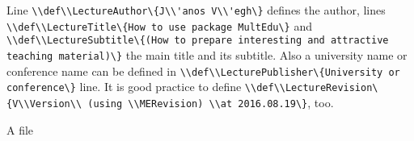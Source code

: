 {
Line \lstinline|\\def\\LectureAuthor\{J\\'anos V\\'egh\}| defines the author,
lines \lstinline|\\def\\LectureTitle\{How to use package MultEdu\}|
and \lstinline|\\def\\LectureSubtitle\{(How to prepare interesting and attractive teaching material)\}| the main title and its subtitle.
Also a university name or conference name can be defined in \lstinline|\\def\\LecturePublisher\{University or conference\}| line.
It is good practice to define \lstinline|\\def\\LectureRevision\{V\\Version\\ (using \\MERevision) \\at 2016.08.19\}|, too.

}
{A  file}
